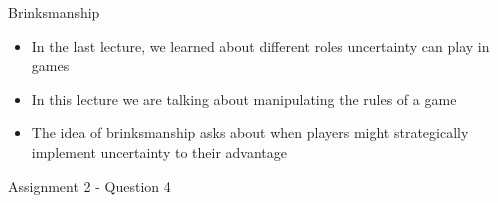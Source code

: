
\begin{frame}{Brinksmanship}
  \begin{itemize}
    \item In the last lecture, we learned about different roles \alert{uncertainty} can play in games 
    \item In this lecture we are talking about manipulating the rules of a game
    \item The idea of \alert{brinksmanship} asks about when players might strategically implement uncertainty to their advantage
  \end{itemize} 
\end{frame}

\begin{frame}{Assignment 2 - Question 4}
\end{frame}
